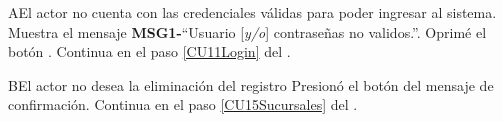 		\begin{UCtrayectoriaA}{A}{El actor no cuenta con las credenciales válidas para poder ingresar al sistema.}
			\UCpaso Muestra el mensaje {\bf MSG1-}``Usuario [{\em y/o}] contraseñas no validos.''.
			\UCpaso[\UCactor] Oprimé el botón .
			\UCpaso Continua en el paso \ref{CU11Login} del .
		\end{UCtrayectoriaA}
		
		
		\begin{UCtrayectoriaA}{B}{El actor no desea la eliminación del registro}
			\UCpaso[\UCactor] Presionó el botón  del mensaje de confirmación.
			\UCpaso Continua en el paso \ref{CU15Sucursales} del . 
		\end{UCtrayectoriaA}		
